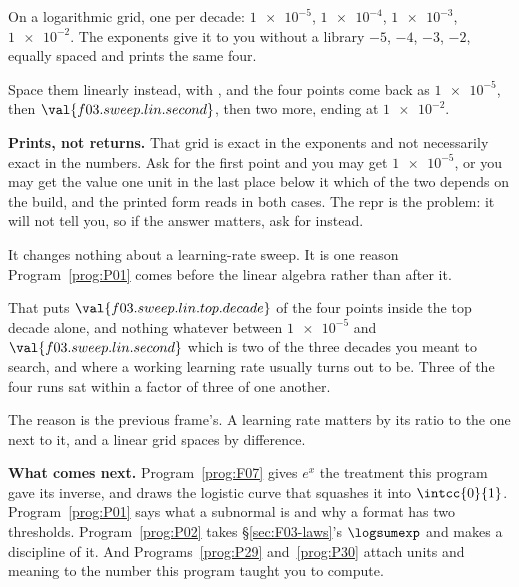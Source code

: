 \begin{fr}
\begin{ansblock}
On a logarithmic grid, one per decade: $\num{1e-5}$, $\num{1e-4}$,
$\num{1e-3}$, $\num{1e-2}$. The exponents give it to you without a library
\dash{} $-5$, $-4$, $-3$, $-2$, equally spaced \dash{} and
 prints the same four.

Space them linearly instead, with , and the
four points come back as $\num{1e-5}$, then $\val{f03.sweep.lin.second}$, then
two more, ending at $\num{1e-2}$.
\end{ansblock}

\begin{note}
\textbf{Prints, not returns.} That grid is exact in the exponents and not
necessarily exact in the numbers. Ask  for the first point and
you may get $\num{1e-5}$, or you may get the value one unit in the last place
below it \dash{} which of the two depends on the build, and the printed form
reads  in both cases. The repr is the problem: it will not tell
you, so if the answer matters, ask for  instead.

It changes nothing about a learning-rate sweep. It is one reason
Program~\ref{prog:P01} comes before the linear algebra rather than after it.
\end{note}

That puts $\val{f03.sweep.lin.top.decade}$ of the four points inside the top
decade alone, and nothing whatever between $\num{1e-5}$ and
$\val{f03.sweep.lin.second}$ \dash{} which is two of the three decades you
meant to search, and where a working learning rate usually turns out to be.
Three of the four runs sat within a factor of three of one another.

The reason is the previous frame's. A learning rate matters by its ratio to the
one next to it, and a linear grid spaces by difference.

\medskip
\noindent
\textbf{What comes next.} Program~\ref{prog:F07} gives $e^{x}$ the treatment
this program gave its inverse, and draws the logistic curve that squashes it
into $\intcc{0}{1}$. Program~\ref{prog:P01} says what a subnormal is and why a
format has two thresholds. Program~\ref{prog:P02} takes
\S\ref{sec:F03-laws}'s $\logsumexp$ and makes a discipline of it.
And Programs~\ref{prog:P29} and~\ref{prog:P30} attach units and meaning to the
number this program taught you to compute.
\end{fr}

